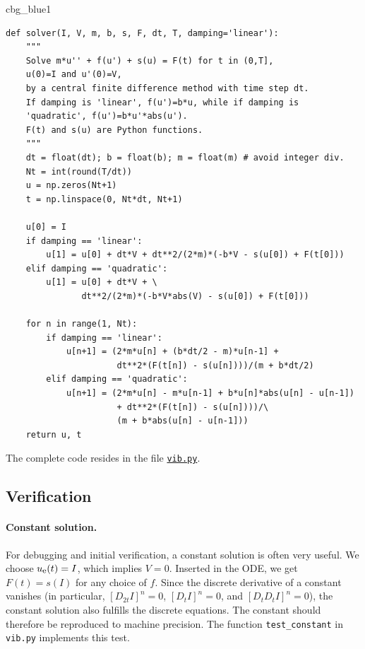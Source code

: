 \documentclass[%
oneside,                 %
final,                   %
10pt]{article}
\newenvironment{_cod_tight}[1]{
   \def\FrameCommand{\colorbox{#1}}
   \FrameRule0.6pt\MakeFramed {\FrameRestore}\vskip3mm}
   {\vskip0mm\endMakeFramed}
\newenvironment{cod}[1]{
\bgroup\rmfamily
\fboxsep=0mm\relax
\begin{_cod_tight}{#1}
\list{}{\parsep=-2mm\parskip=0mm\topsep=0pt\leftmargin=2mm
\rightmargin=2\leftmargin\leftmargin=4pt\relax}
\item\relax}
{\endlist\end{_cod_tight}\egroup}
\begin{document}
\begin{cod}{cbg_blue1}\begin{Verbatim}[numbers=none,fontsize=\fontsize{9pt}{9pt},baselinestretch=0.95,xleftmargin=2mm]
def solver(I, V, m, b, s, F, dt, T, damping='linear'):
    """
    Solve m*u'' + f(u') + s(u) = F(t) for t in (0,T],
    u(0)=I and u'(0)=V,
    by a central finite difference method with time step dt.
    If damping is 'linear', f(u')=b*u, while if damping is
    'quadratic', f(u')=b*u'*abs(u').
    F(t) and s(u) are Python functions.
    """
    dt = float(dt); b = float(b); m = float(m) # avoid integer div.
    Nt = int(round(T/dt))
    u = np.zeros(Nt+1)
    t = np.linspace(0, Nt*dt, Nt+1)

    u[0] = I
    if damping == 'linear':
        u[1] = u[0] + dt*V + dt**2/(2*m)*(-b*V - s(u[0]) + F(t[0]))
    elif damping == 'quadratic':
        u[1] = u[0] + dt*V + \ 
               dt**2/(2*m)*(-b*V*abs(V) - s(u[0]) + F(t[0]))

    for n in range(1, Nt):
        if damping == 'linear':
            u[n+1] = (2*m*u[n] + (b*dt/2 - m)*u[n-1] +
                      dt**2*(F(t[n]) - s(u[n])))/(m + b*dt/2)
        elif damping == 'quadratic':
            u[n+1] = (2*m*u[n] - m*u[n-1] + b*u[n]*abs(u[n] - u[n-1])
                      + dt**2*(F(t[n]) - s(u[n])))/\ 
                      (m + b*abs(u[n] - u[n-1]))
    return u, t
\end{Verbatim}
\end{cod}
\noindent
The complete code resides in the file \href{{http://tinyurl.com/nm5587k/vib/vib.py}}{\nolinkurl{vib.py}}.

\subsection{Verification}
\label{vib:ode2:verify}

\paragraph{Constant solution.}
For debugging and initial verification, a constant solution is often
very useful. We choose $\uex(t)=I$, which implies $V=0$.
Inserted in the ODE, we get
$F(t)=s(I)$ for any choice of $f$. Since the discrete derivative
of a constant vanishes (in particular, $[D_{2t}I]^n=0$,
$[D_tI]^n=0$, and $[D_tD_t I]^n=0$), the constant solution also fulfills
the discrete equations. The constant should therefore be reproduced
to machine precision. The function \Verb!test_constant! in \texttt{vib.py}
implements this test.
\end{document}
